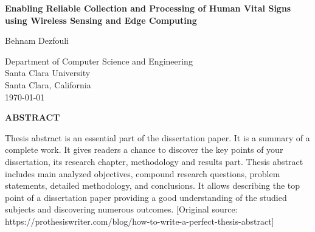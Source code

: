 \begin{center}

\vfill

{\large\bf Enabling Reliable Collection and Processing of Human Vital Signs using Wireless Sensing and Edge Computing
}

\vspace{5mm}

Behnam Dezfouli


{\singlespacing
Department of Computer Science and Engineering\\
Santa Clara University\\
Santa Clara, California\\
\today
}

\vspace{5mm}

{\large\bf ABSTRACT}
\end{center}

{\singlespacing

Thesis abstract is an essential part of the dissertation paper. It is a summary of a complete work. It gives readers a chance to discover the key points of your dissertation, its research chapter, methodology and results part.
Thesis abstract includes main analyzed objectives, compound research questions, problem statements, detailed methodology, and conclusions. It allows describing the top point of a dissertation paper providing a good understanding of the studied subjects and discovering numerous outcomes. [Original source: https://prothesiswriter.com/blog/how-to-write-a-perfect-thesis-abstract]

}
